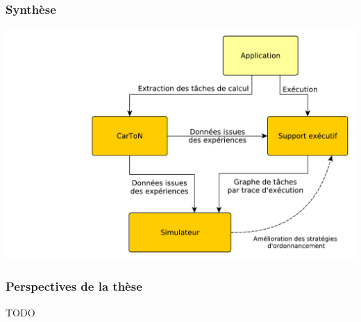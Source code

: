 \documentclass[xcolor={usenames,dvipsnames,svgnames,table}, aspectratio=43]{beamer}
\begin{document}
\begin{frame}
  \frametitle{Synthèse}

    \includegraphics[width=\textwidth]{graph/big_picture.pdf}
\end{frame}


\begin{frame}
  \frametitle{Perspectives de la thèse}

  TODO

\end{frame}


\end{document}
